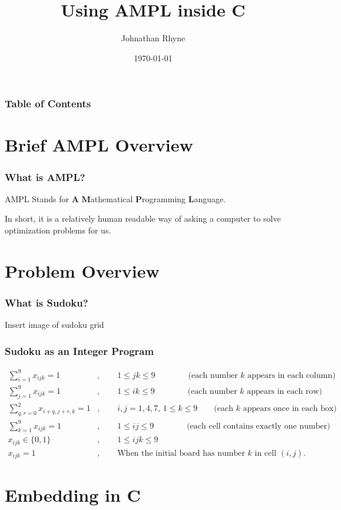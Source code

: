 \documentclass{beamer}
\title{Using AMPL inside C}
\author{Johnathan Rhyne}
\institute{CU Denver}
\date{\today}
\begin{document}
    \frame{\titlepage}
    \begin{frame}
        \frametitle{Table of Contents}
        \tableofcontents
    \end{frame}
    \section{Brief AMPL Overview}
    \begin{frame}
        \frametitle{What is AMPL?}
        AMPL Stands for \textbf{A} \textbf{M}athematical \textbf{P}rogramming \textbf{L}anguage.

        In short, it is a relatively
        human readable way of asking a computer to solve optimization problems for us.
    \end{frame}
    \section{Problem Overview}
    \begin{frame}
        \frametitle{What is Sudoku?}
        Insert image of sudoku grid 
    \end{frame}
    \begin{frame}
        \frametitle{Sudoku as an Integer Program}
        \footnotesize
        \begin{align*}
            \sum_{i=1}^9 x_{ijk} = 1&,\qquad 1\leq jk\leq 9\qquad\qquad\text{(each number $k$ appears in each column)}\\
            \sum_{j=1}^9 x_{ijk} = 1&,\qquad 1\leq ik\leq 9\qquad\qquad\text{(each number $k$ appears in each row)} \\
            \sum_{q,r=0}^2x_{i+q,j+r,k} = 1&, \qquad i,j=1,4,7,\, 1\leq k \leq 9 \qquad\text{(each $k$ appears once in each box)}\\
            \sum_{k=1}^9 x_{ijk} = 1&,\qquad 1\leq ij\leq 9\qquad\qquad\text{(each cell contains exactly one number)} \\
            x_{ijk}\in\{0,1\} &, \qquad 1\leq ijk\leq 9 \\
            x_{ijk} = 1 &,  \qquad\text{When the initial board has number $k$ in cell $(i,j)$.}
        \end{align*}
    \end{frame}
    \section{Embedding in C}
\end{document}
